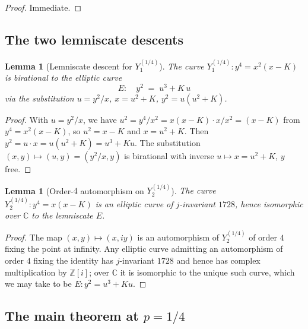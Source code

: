 \documentclass[11pt,a4paper]{article}
\theoremstyle{plain}
\newtheorem{lemma}[theorem]{Lemma}
\theoremstyle{definition}
\theoremstyle{remark}
\newcommand{\C}{\mathbb{C}}
\newcommand{\Z}{\mathbb{Z}}
\begin{document}
\begin{proof}
Immediate.
\end{proof}

\subsection*{The two lemniscate descents}

\begin{lemma}[Lemniscate descent for $Y_1^{(1/4)}$]\label{lem:Y1-lem}
The curve $Y_1^{(1/4)}\colon y^4 = x^2(x-K)$ is birational to the elliptic curve
\[
  E\colon \quad y^2 \;=\; u^3 + K\,u
\]
via the substitution $u = y^2/x$, $x = u^2 + K$, $y^2 = u(u^2 + K)$.
\end{lemma}

\begin{proof}
With $u = y^2/x$, we have $u^2 = y^4/x^2 = x(x-K) \cdot x / x^2 = (x-K)$ from $y^4 = x^2(x-K)$, so $u^2 = x - K$ and $x = u^2 + K$. Then $y^2 = u \cdot x = u(u^2 + K) = u^3 + K u$. The substitution $(x, y) \mapsto (u, y) = (y^2/x, y)$ is birational with inverse $u \mapsto x = u^2 + K$, $y$ free.
\end{proof}

\begin{lemma}[Order-$4$ automorphism on $Y_2^{(1/4)}$]\label{lem:Y2-aut}
The curve $Y_2^{(1/4)}\colon y^4 = x(x-K)$ is an elliptic curve of $j$-invariant $1728$, hence isomorphic over $\C$ to the lemniscate $E$.
\end{lemma}

\begin{proof}
The map $(x, y) \mapsto (x, iy)$ is an automorphism of $Y_2^{(1/4)}$ of order $4$ fixing the point at infinity. Any elliptic curve admitting an automorphism of order $4$ fixing the identity has $j$-invariant $1728$ and hence has complex multiplication by $\Z[i]$; over $\C$ it is isomorphic to the unique such curve, which we may take to be $E\colon y^2 = u^3 + K u$.
\end{proof}

\subsection*{The main theorem at $p = 1/4$}
\end{document}
